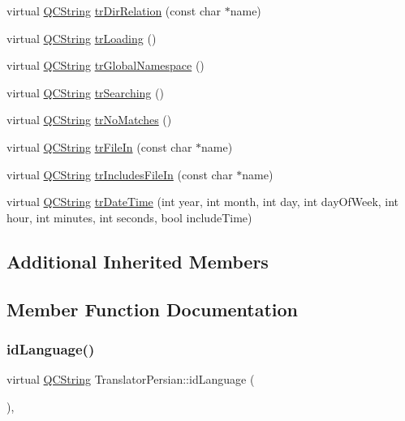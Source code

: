 \begin{DoxyCompactItemize}
\item 
virtual \mbox{\hyperlink{class_q_c_string}{Q\+C\+String}} \mbox{\hyperlink{class_translator_persian_aee44dbc70588bd500a54a05834d8abf5}{tr\+Dir\+Relation}} (const char $\ast$name)
\item 
virtual \mbox{\hyperlink{class_q_c_string}{Q\+C\+String}} \mbox{\hyperlink{class_translator_persian_a24ef149e27d80177e7eca6afefa440eb}{tr\+Loading}} ()
\item 
virtual \mbox{\hyperlink{class_q_c_string}{Q\+C\+String}} \mbox{\hyperlink{class_translator_persian_a74d0965e05e6063668a776e2d02bc954}{tr\+Global\+Namespace}} ()
\item 
virtual \mbox{\hyperlink{class_q_c_string}{Q\+C\+String}} \mbox{\hyperlink{class_translator_persian_a86abda5f0e1ef23e5453801b8260223f}{tr\+Searching}} ()
\item 
virtual \mbox{\hyperlink{class_q_c_string}{Q\+C\+String}} \mbox{\hyperlink{class_translator_persian_addaea0e6c495cf11ff8454962e1e8376}{tr\+No\+Matches}} ()
\item 
virtual \mbox{\hyperlink{class_q_c_string}{Q\+C\+String}} \mbox{\hyperlink{class_translator_persian_a01b3230c895220cf87a69fef63b62a4c}{tr\+File\+In}} (const char $\ast$name)
\item 
virtual \mbox{\hyperlink{class_q_c_string}{Q\+C\+String}} \mbox{\hyperlink{class_translator_persian_aa38fe54c99986ebfc49fd381111d7ed6}{tr\+Includes\+File\+In}} (const char $\ast$name)
\item 
virtual \mbox{\hyperlink{class_q_c_string}{Q\+C\+String}} \mbox{\hyperlink{class_translator_persian_ac226f015b06ad5461d33f2faaabb8143}{tr\+Date\+Time}} (int year, int month, int day, int day\+Of\+Week, int hour, int minutes, int seconds, bool include\+Time)
\end{DoxyCompactItemize}
\subsection*{Additional Inherited Members}


\subsection{Member Function Documentation}
\mbox{\label{class_translator_persian_a9997bf6f7a1240bf3367da6c77833850}} 
\subsubsection{\texorpdfstring{idLanguage()}{idLanguage()}}
{\footnotesize\ttfamily virtual \mbox{\hyperlink{class_q_c_string}{Q\+C\+String}} Translator\+Persian\+::id\+Language (\begin{DoxyParamCaption}{ }\end{DoxyParamCaption})\hspace{0.3cm}{\ttfamily [inline]}, {\ttfamily [virtual]}}


